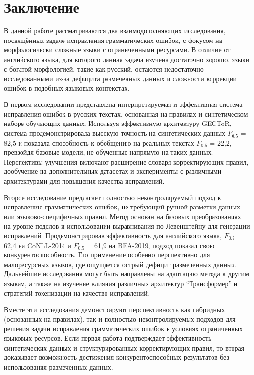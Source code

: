 \newpage

\section{Заключение}

В данной работе рассматриваются два взаимодополняющих исследования, посвящённых задаче исправления грамматических ошибок, с фокусом на морфологически сложные языки с ограниченными ресурсами. В отличие от английского языка, для которого данная задача изучена достаточно хорошо, языки с богатой морфологией, такие как русский, остаются недостаточно исследованными из-за дефицита размеченных данных и сложности коррекции ошибок в подобных языковых контекстах.

В первом исследовании представлена интерпретируемая и эффективная система исправления ошибок в русских текстах, основанная на правилах и синтетическом наборе обучающих данных. Используя эффективную архитектуру GECToR, система продемонстрировала высокую точность на синтетических данных $F_{0.5}$ = 82,5 и показала способность к обобщению на реальных текстах $F_{0.5}$ = 22,2, превзойдя базовые модели, не обученные напрямую на таких данных. Перспективы улучшения включают расширение словаря корректирующих правил, дообучение на дополнительных датасетах и эксперименты с различными архитектурами для повышения качества исправлений.

Второе исследование предлагает полностью неконтролируемый подход к исправлению грамматических ошибок, не требующий ручной разметки данных или языково-специфичных правил. Метод основан на базовых преобразованиях на уровне подслов и использовании выравнивания по Левенштейну для генерации исправлений. Продемонстрировав эффективность для английского языка, $F_{0.5}$ = 62,4 на CoNLL-2014 и $F_{0.5}$ = 61,9 на BEA-2019, подход показал свою конкурентоспособность. Его применение особенно перспективно для малоресурсных языков, где ощущается острый дефицит размеченных данных. Дальнейшие исследования могут быть направлены на адаптацию метода к другим языкам, а также на изучение влияния различных архитектур “Трансформер” и стратегий токенизации на качество исправлений.

Вместе эти исследования демонстрируют перспективность как гибридных (основанных на правилах), так и полностью неконтролируемых подходов для решения задачи исправления грамматических ошибок в условиях ограниченных языковых ресурсов. Если первая работа подтверждает эффективность синтетических данных и структурированных корректирующих правил, то вторая доказывает возможность достижения конкурентоспособных результатов без использования размеченных данных. 

